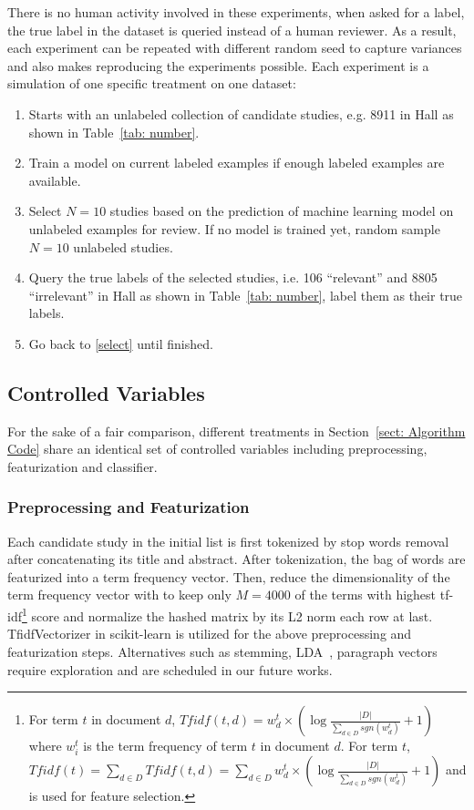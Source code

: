 \documentclass{svjour3}
\theoremstyle{break}
\begin{document}
There is no human activity involved in these experiments, when asked for a label, the true label in the dataset is queried instead of a human reviewer. As a result, each experiment can be repeated with different random seed to capture variances and also makes reproducing the experiments possible. Each experiment is a simulation of one specific treatment on one dataset:

\begin{enumerate}
\item
Starts with an unlabeled collection of candidate studies, e.g. 8911 in Hall as shown in Table~\ref{tab: number}.

\item
\label{select}
Train a model on current labeled examples if enough labeled examples are available.

\item
Select $N=10$ studies based on the prediction of machine learning model on unlabeled examples for review. If no model is trained yet, random sample $N=10$ unlabeled studies.

\item
Query the true labels of the selected studies, i.e. 106 ``relevant'' and 8805 ``irrelevant'' in Hall as shown in Table~\ref{tab: number}, label them as their true labels.

\item
Go back to \ref{select} until finished.

\end{enumerate}


\subsection{Controlled Variables}
\label{subsect: Controlled Variables}

For the sake of a fair comparison, different treatments in Section~\ref{sect: Algorithm Code} share an identical set of controlled variables including preprocessing, featurization and classifier. 

\subsubsection{Preprocessing and Featurization}

Each candidate study in the initial list is first tokenized by stop words removal after concatenating its title and abstract. After tokenization, the bag of words are featurized into a term frequency vector. Then, reduce the dimensionality of the term frequency vector with to keep only $M=4000$ of the terms with highest tf-idf\footnote{For term $t$ in document $d$, $Tfidf(t, d)=w^t_d\times (\log \frac{|D|}{\sum_{d\in D} sgn(w^t_d)}+1)$ where $w^t_i$ is the term frequency of term $t$ in document $d$. For term $t$, $Tfidf(t) = \sum_{d\in D} Tfidf(t,d) = \sum_{d\in D} w^t_d \times (\log \frac{|D|}{\sum_{d\in D} sgn(w^t_d)}+1)$ and is used for feature selection.} score and normalize the hashed matrix by its L2 norm each row at last. TfidfVectorizer in scikit-learn is utilized for the above preprocessing and featurization steps. Alternatives such as stemming, LDA~\cite{blei2003latent}, paragraph vectors~\cite{le2014distributed} require exploration and are scheduled in our future works. 
\end{document}
